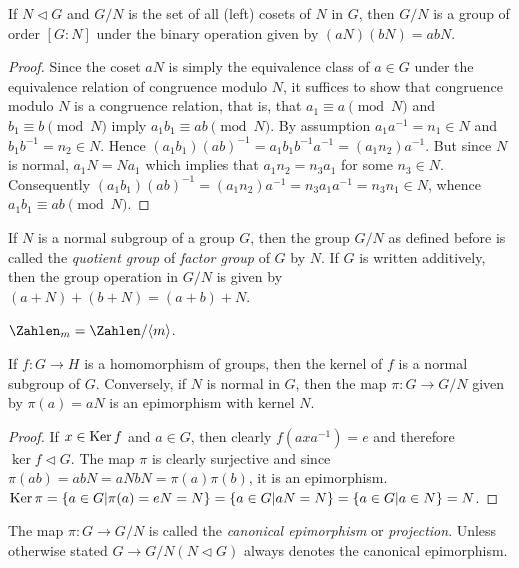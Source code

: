 \begin{theorem}
	If $ N \vartriangleleft G $ and $ G/N $ is the set of all (left) cosets of $ N $ in $ G $, then $ G / N $ is a group of order $ [G:N] $ under the binary operation given by $ (aN)(bN)=abN $.
\end{theorem}
\begin{proof}
	Since the coset $ aN $ is simply the equivalence class of $ a \in G $ under the equivalence relation of congruence modulo $ N $, it suffices to show that congruence modulo $ N $ is a congruence relation, that is, that $ a_1 \equiv a \pmod{N} $ and $ b_1 \equiv b \pmod{N} $ imply $ a_1 b_1 \equiv ab \pmod{N} $. By assumption $ a_1 a^{-1}=n_1 \in N $ and $ b_1 b^{-1}=n_2 \in N $. Hence $ (a_1 b_1)(ab)^{-1} =a_1 b_1 b^{-1}a^{-1}=(a_1 n_2)a^{-1}$. But since $ N $ is normal, $ a_1N = Na_1 $ which implies that $ a_1 n_2 = n_3 a_1$ for some $ n_3 \in N $. Consequently $ (a_1 b_1)(ab)^{-1} = (a_1 n_2)a^{-1}=n_3 a_1 a^{-1} = n_3 n_1 \in N $, whence $ a_1 b_1 \equiv ab \pmod{N} $.
\end{proof}
\begin{definition}
	If $ N $ is a normal subgroup of a group $ G $, then the group $ G/N $ as defined before is called the \textit{quotient group} of \textit{factor group} of $ G $ by $ N $. If $ G $ is written additively, then the group operation in $ G /N $ is given by $ (a+N)+(b+N)=(a+b)+N $.
\end{definition}
\begin{Example}
	$ \Zahlen_m = \Zahlen / \langle m \rangle $.
\end{Example}
\begin{theorem}
	If $ f:G \to H $ is a homomorphism of groups, then the kernel of $ f $ is a normal subgroup of $ G $. Conversely, if $ N $ is normal in $ G $, then the map $ \pi:G \to G/N $ given by $ \pi(a)=aN $ is an epimorphism with kernel $ N $.
\end{theorem}
\begin{proof}
	If $ x \in \operatorname{Ker} f $ and $ a \in G $, then clearly $ f(axa^{-1})=e $ and therefore $ \ker f \vartriangleleft G $. The map $ \pi $ is clearly surjective and since $ \pi(ab)=ab N = aNbN = \pi(a)\pi(b) $, it is an epimorphism. $ \operatorname{Ker} \pi = \{a \in G |\pi(a)=eN=N \}=\{a\in G |aN = N \}=\{a \in G| a \in N \}=N $.
\end{proof}
\begin{definition}
	The map $ \pi:G \to G/N $ is called the \textit{canonical epimorphism} or \textit{projection}. Unless otherwise stated $ G \to G/N(N \vartriangleleft G) $ always denotes the canonical epimorphism.
\end{definition}
